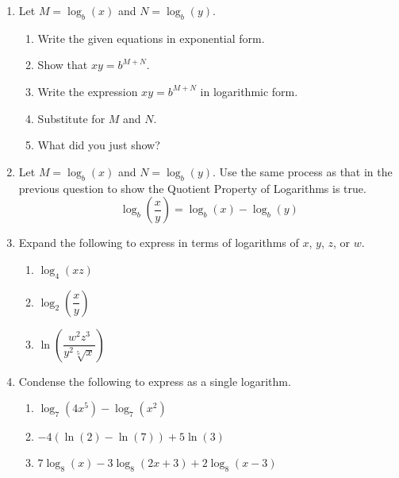 \begin{enumerate}

\item Let $M=\log_b(x)$ and $N=\log_b(y)$.
\begin{enumerate}
\item Write the given equations in exponential form.

  \vfill
\item Show that $xy=b^{M+N}$.

  \vfill
\item Write the expression $xy=b^{M+N}$ in logarithmic form.

  \vfill

\item Substitute for $M$ and $N$.

  \vfill
  
\item What did you just show?

  \vspace{1em}

\end{enumerate}

\clearpage

\item Let $M=\log_b(x)$ and $N=\log_b(y)$.  Use the same process as
  that in the previous question to show the Quotient Property of
  Logarithms is true.
  $$\log_b\left(\frac{x}{y}\right)=\log_b(x)-\log_b(y)$$
\vfill
\vfill
\vfill


\clearpage

\item Expand the following to express in terms of logarithms of $x$, $y$, $z$, or $w$.
\begin{enumerate}
\item $\log_4(xz)$ \\[.2in]
\item $\log_2\left( \dfrac{x}{y} \right)$ \\[.2in]
\item $\ln\left( \dfrac{w^2z^3}{y^2\sqrt[5]{x}} \right)$ \\[1in]
\end{enumerate}



\item Condense the following to express as a single logarithm.
\begin{enumerate}
\item $\log_7(4x^5)-\log_7(x^2)$ \\[.5in]
\item $-4\left(\ln(2)-\ln(7)\right)+5\ln(3)$ \\[.7in]
\item $7 \log_8 (x) - 3 \log_8(2x+3) + 2\log_8(x-3)$ \\[1in]


\end{enumerate}
\end{enumerate}
